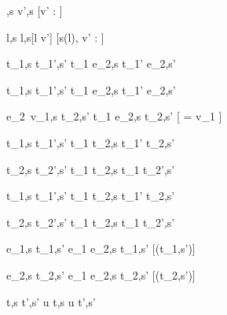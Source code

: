   { }
  {\Enter \tau,s  \Edit v',s}
  [v' : \tau]

  { }
  {\Update l,s  \Update l,s[l \mapsto v']{}}
  [s(l), v' : \tau]


  {t_1,s  t_1',s'}
  {t_1 \Then e_2,s  t_1' \Then e_2,s'}

  {t_1,s  t_1',s'}
  {t_1 \Next e_2,s  t_1' \Next e_2,s'}

  {e_2\ v_1,s \normalise t_2,s'}
  {t_1 \Next e_2,s \handle{\Continue} t_2,s'}
  [ = v_1 \wedge \neg{}]


  {t_1,s  t_1',s' }
  {t_1 \And t_2,s  t_1' \And t_2,s'}

  {t_2,s  t_2',s'}
  {t_1 \And t_2,s  t_1 \And t_2',s'}


  {t_1,s  t_1',s'}
  {t_1 \Or t_2,s  t_1' \Or t_2,s'}

  {t_2,s  t_2',s' }
  {t_1 \Or t_2,s  t_1 \Or t_2',s'}


  {e_1,s \normalise t_1,s'}
  {e_1 \Xor e_2,s \handle{\Left} t_1,s'}
  [\neg\Failing(t_1,s')]

  {e_2,s \normalise t_2,s'}
  {e_1 \Xor e_2,s \handle{\Right} t_2,s'}
  [\neg\Failing(t_2,s')]


  {t,s  t',s'}
  {u \At t,s u \At t',s'}









